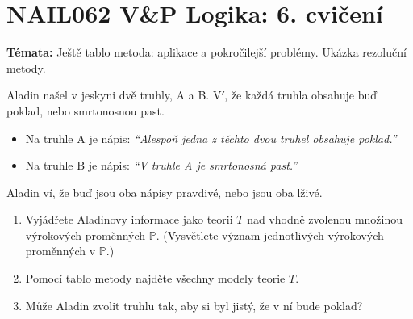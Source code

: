 \documentclass[a4paper,12pt]{article}
\begin{document}
\section*{NAIL062 V\&P Logika: 6. cvičení}



\textbf{Témata:} 
Ještě tablo metoda: aplikace a pokročilejší problémy. Ukázka rezoluční metody.



\medskip\begin{problem}
    Aladin našel v jeskyni dvě truhly, A a B. Ví, že každá truhla obsahuje buď poklad, nebo smrtonosnou past.
    \begin{itemize}
    \item Na truhle A je nápis: {\it ``Alespoň jedna z těchto dvou truhel obsahuje poklad.''}
    \item Na truhle B je nápis: {\it ``V truhle A je smrtonosná past.''}
    \end{itemize}
    Aladin ví, že buď jsou oba nápisy pravdivé, nebo jsou oba lživé.
    \begin{enumerate}
        \item Vyjádřete Aladinovy informace jako teorii $T$ nad vhodně zvolenou množinou výrokových proměnných $\mathbb P$. (Vysvětlete význam jednotlivých výrokových proměnných v $\mathbb P$.)
        \item Pomocí tablo metody najděte všechny modely teorie $T$.
        \item Může Aladin zvolit truhlu tak, aby si byl jistý, že v ní bude poklad?
    \end{enumerate}
    \end{problem}
    
\end{document}
